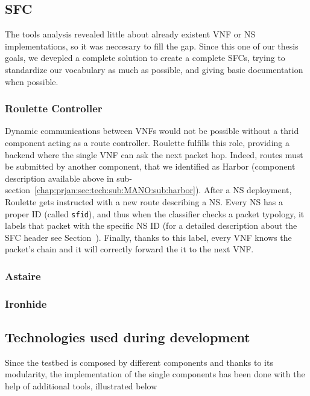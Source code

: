 \subsection{SFC}
The tools analysis revealed little about already existent VNF or NS
implementations, so it was neccesary to fill the gap. Since this one of our
thesis goals, we devepled a complete solution to create a complete SFCs, trying
to standardize our vocabulary as much as possible, and giving basic
documentation when possible.

\subsubsection{Roulette Controller}
\label{chap:prjan:sec:tech:sub:SFC:sub:roulette}
Dynamic communications between VNFs would not be possible without a thrid
component acting as a route controller. Roulette fulfills this role, providing a
backend where the single VNF can ask the next packet hop. Indeed, routes must be
submitted by another component, that we identified as Harbor (component
description available above in
sub-section~\ref{chap:prjan:sec:tech:sub:MANO:sub:harbor}). After a NS
deployment, Roulette gets instructed with a new route describing a NS. Every NS
has a proper ID (called \verb!sfid!), and thus when the classifier checks a
packet typology, it labels that packet with the specific NS ID (for a detailed
description about the SFC header see Section~). Finally, thanks to this label, every VNF knows the packet's chain and
it will correctly forward the it to the next VNF.

\subsubsection{Astaire}

\subsubsection{Ironhide}


\subsection{Technologies used during development}

Since the testbed is composed by different components and thanks to its 
modularity, the implementation of the single components has been done with the 
help of additional tools, illustrated below

